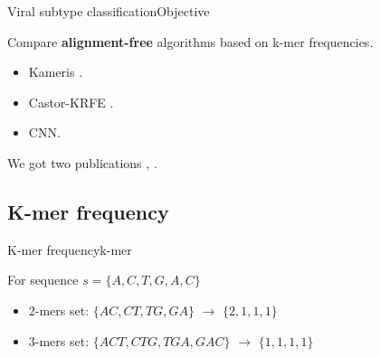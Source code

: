 \documentclass[10pt]{beamer}
\newcommand{\1}{
        	\setbeamertemplate{background}{
        		\texttt{[image: img/1]}
        		\tikz[overlay] \fill[fill opacity=0.75,fill=white] (0,0) rectangle (-\paperwidth,\paperheight);
        	}
}
\begin{document}
\begin{frame}{Viral subtype classification}{Objective}
	\begin{block}{}
		Compare  \textbf{alignment-free} algorithms based on k-mer frequencies. 
		\begin{itemize}
			\item Kameris  \cite{solis2018open}.
			\item Castor-KRFE  \cite{lebatteux2019toward}.
			\item CNN.
		\end{itemize}
	\end{block}

	\begin{block}{}
		 We got two publications \cite{arceda2020analysis},  \cite{machaca2020analysis}.
	\end{block}
	
\end{frame}



\subsection{K-mer frequency}

\begin{frame}{K-mer frequency}{k-mer}
	\begin{block}{}
		For sequence  $s = \{ A,C,T,G,A,C \}$
	\end{block}
	
	\begin{block}{}
		\begin{itemize}
			\item 2-mers set: $\{ AC, CT, TG, GA \}$  $\rightarrow$ $\{ 2, 1, 1, 1 \}$
			\item 3-mers set: $\{ ACT, CTG, TGA, GAC \}$	$\rightarrow$ $\{ 1, 1, 1, 1 \}$			 	
		\end{itemize}
	\end{block}	
\end{frame}
\end{document}
